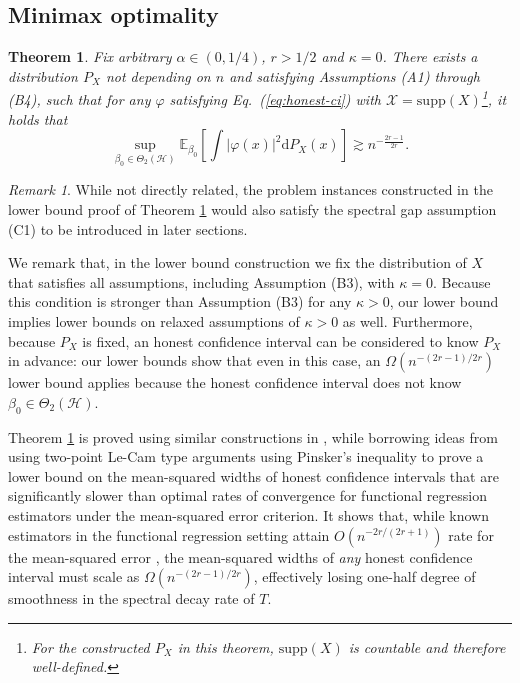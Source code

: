 \documentclass[11pt,a4paper]{article}
\theoremstyle{definition}
\theoremstyle{plain}
\newtheorem{theorem}{Theorem}[section]
\theoremstyle{remark}
\newtheorem{remark}{Remark}[section]
\newcommand{\ud}{\mathrm d}
\newcommand{\mH}{\mathcal H}
\begin{document}
\subsection{Minimax optimality}

\begin{theorem}
Fix arbitrary $\alpha\in(0,1/4)$, $r>1/2$ and $\kappa=0$. There exists a distribution $P_X$ \emph{not} depending on $n$ and satisfying Assumptions (A1) through (B4), such that for any $\varphi$ satisfying Eq.~(\ref{eq:honest-ci}) with $\mathcal X=\mathrm{supp}(X)$\footnote{For the constructed $P_X$ in this theorem, $\mathrm{supp}(X)$ is countable and therefore well-defined.}, it holds that
$$
\sup_{\beta_0\in\Theta_2(\mH)} \mathbb E_{\beta_0}\left[\int\big|\varphi(x)\big|^2\ud P_X(x)\right] \gtrsim n^{-\frac{2r-1}{2r}}.
$$
\label{thm:isokrr-lb}
\end{theorem}

\begin{remark}
While not directly related, the problem instances constructed in the lower bound proof of Theorem \ref{thm:isokrr-lb} would also satisfy the spectral gap assumption (C1) to be introduced in later sections.
\end{remark}

We remark that, in the lower bound construction we fix the distribution of $X$ that satisfies all assumptions, including Assumption (B3), with $\kappa=0$.
Because this condition is stronger than Assumption (B3) for any $\kappa>0$, our lower bound implies lower bounds on relaxed assumptions of $\kappa>0$ as well.
Furthermore, because $P_X$ is fixed, an honest confidence interval can be considered to know $P_X$ in advance: our lower bounds show that even in this case,
an $\Omega(n^{-(2r-1)/2r})$ lower bound applies because the honest confidence interval does not know $\beta_0\in\Theta_2(\mH)$.

Theorem \ref{thm:isokrr-lb} is proved using similar constructions in \citep{cai2012minimax}, while borrowing ideas from \citep{cai2006adaptive} 
using two-point Le-Cam type arguments using Pinsker's inequality to prove a lower bound on the mean-squared widths of honest confidence intervals
that are significantly slower than optimal rates of convergence for functional regression estimators under the mean-squared error criterion.
It shows that, while known estimators in the functional regression setting attain $O(n^{-2r/(2r+1)})$ rate for the mean-squared error \citep{cai2012minimax},
the mean-squared widths of \emph{any} honest confidence interval must scale as $\Omega(n^{-(2r-1)/2r})$, effectively losing one-half degree of smoothness in the spectral decay rate of $T$.
\end{document}
